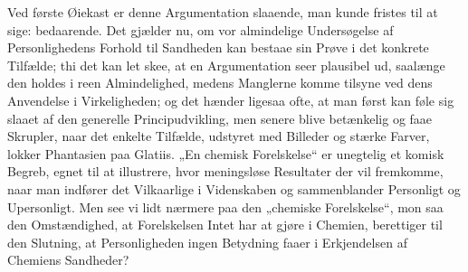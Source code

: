\documentclass[12pt,a4paper]{book}
\newcommand{\opage}[1]{\marginnote{\footnotesize\textit{[#1]}}}
\begin{document}
\opage{28}\setcounter{footnote}{0}%
Ved første Øiekast er denne Argumentation slaaende,
man kunde fristes til at sige: bedaarende. Det gjælder
nu, om vor almindelige Undersøgelse af Personlighedens
Forhold til Sandheden kan bestaae sin Prøve i det konkrete
Tilfælde; thi det kan let skee, at en Argumentation
seer plausibel ud, saalænge den holdes i reen Almindelighed,
medens Manglerne komme tilsyne ved dens Anvendelse
i Virkeligheden; og det hænder ligesaa ofte, at
man først kan føle sig slaaet af den generelle Principudvikling,
men senere blive betænkelig og faae Skrupler,
naar det enkelte Tilfælde, udstyret med Billeder og stærke
Farver, lokker Phantasien paa Glatiis. „En chemisk
Forelskelse“ er unegtelig et komisk Begreb, egnet til at
illustrere, hvor meningsløse Resultater der vil fremkomme,
naar man indfører det Vilkaarlige i Videnskaben
og sammenblander Personligt og Upersonligt. Men see
vi lidt nærmere paa den „chemiske Forelskelse“, mon
saa den Omstændighed, at Forelskelsen Intet har at
gjøre i Chemien, berettiger til den Slutning, at Personligheden
ingen Betydning faaer i Erkjendelsen af
Chemiens Sandheder?
\end{document}
